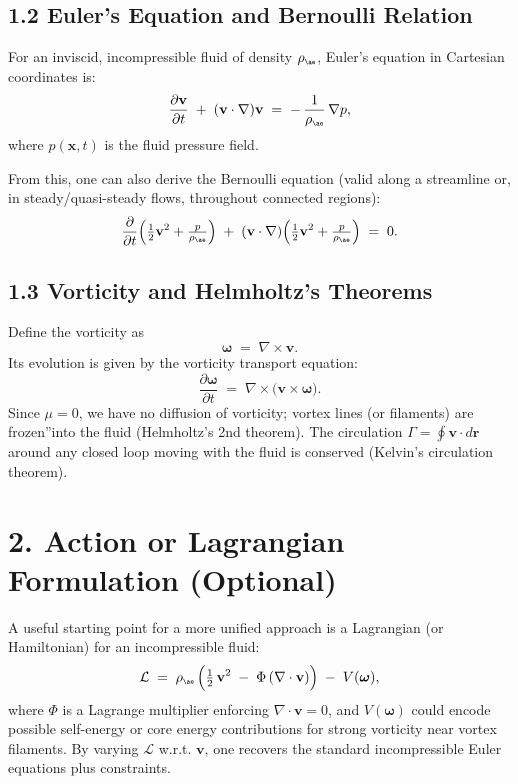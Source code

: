 \documentclass[a4paper,12pt]{article}
\begin{document}
\subsection*{1.2 Euler's Equation and Bernoulli Relation}
For an inviscid, incompressible fluid of density \(\rho_{\scriptscriptstyle \mathrm{\ae}}\), Euler's equation in Cartesian coordinates is:
\[
 \frac{\partial \mathbf{v}}{\partial t} \;+\; (\mathbf{v}\cdot\nabla)\mathbf{v} \;=\; -\,\frac{1}{\rho_{\scriptscriptstyle \mathrm{\ae}}}\,\nabla p,
\]
where \(p(\mathbf{x},t)\) is the fluid pressure field.

From this, one can also derive the Bernoulli equation (valid along a streamline or, in steady/quasi-steady flows, throughout connected regions):
\[
 \frac{\partial}{\partial t} \Bigl( \tfrac12 \mathbf{v}^2 + \tfrac{p}{\rho_{\scriptscriptstyle \mathrm{\ae}}} \Bigr) \;+\; (\mathbf{v}\cdot\nabla) \Bigl( \tfrac12 \mathbf{v}^2 + \tfrac{p}{\rho_{\scriptscriptstyle \mathrm{\ae}}} \Bigr) \;=\; 0.
\]

\subsection*{1.3 Vorticity and Helmholtz's Theorems}
Define the vorticity as
\[
 \boldsymbol{\omega} \;=\; \nabla \times \mathbf{v}.
\]
Its evolution is given by the vorticity transport equation:
\[
 \frac{\partial \boldsymbol{\omega}}{\partial t} \;=\; \nabla\times\bigl(\mathbf{v}\times\boldsymbol{\omega}\bigr).
\]
Since \(\mu=0\), we have no diffusion of vorticity; vortex lines (or filaments) are \grqq frozen\textquotedblright into the fluid (Helmholtz's 2nd theorem). The circulation \(\Gamma = \oint \mathbf{v}\cdot d\mathbf{r}\) around any closed loop moving with the fluid is conserved (Kelvin's circulation theorem).

\section*{2. Action or Lagrangian Formulation (Optional)}
A useful starting point for a more unified approach is a Lagrangian (or Hamiltonian) for an incompressible fluid:
\[
 \mathcal{L} \;=\; \rho_{\scriptscriptstyle \mathrm{\ae}}\, \Bigl( \tfrac12\,\mathbf{v}^2 \;-\; \Phi\,(\nabla\cdot\mathbf{v}) \Bigr) \;-\; V(\boldsymbol{\omega}),
\]
where \(\Phi\) is a Lagrange multiplier enforcing \(\nabla\cdot \mathbf{v}=0\), and \(V(\boldsymbol{\omega})\) could encode possible self-energy or core energy contributions for strong vorticity near vortex filaments. By varying \(\mathcal{L}\) w.r.t. \(\mathbf{v}\), one recovers the standard incompressible Euler equations plus constraints.
\end{document}

